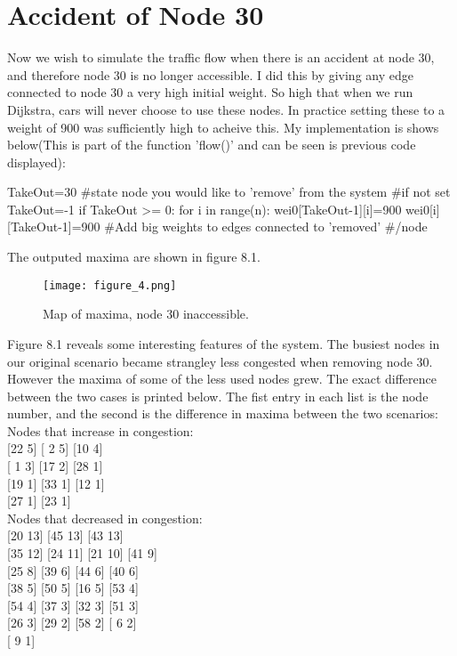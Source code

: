 \documentclass[paper=a4, fontsize=12pt]{scrartcl} %
\numberwithin{equation}{section}       %
\numberwithin{figure}{section}         %
\numberwithin{table}{section}          %
\begin{document}
\section{Accident of Node 30}
Now we wish to simulate the traffic flow when there is an accident at node 30, and therefore node 30 is no longer accessible. I did this by giving any edge connected to node 30 a very high initial weight. So high that when we run Dijkstra, cars will never choose to use these nodes. In practice setting these to a weight of 900 was sufficiently high to acheive this. My implementation is shows below(This is part of the function 'flow()' and can be seen is previous code displayed):
\begin{python}
	TakeOut=30 
	#state node you would like to 'remove' from the system
	#if not set TakeOut=-1
	if TakeOut >= 0:    
		for i in range(n):
		wei0[TakeOut-1][i]=900
		wei0[i][TakeOut-1]=900
	    #Add big weights to edges connected to 'removed' 
	    #/node
\end{python}
The outputed maxima are shown in figure 8.1.
\begin{figure}[H]
	\centering
	\texttt{[image: figure\_4.png]}
	\caption{Map of maxima, node 30 inaccessible.}
	\label{fig:myfigure4}
\end{figure}
Figure 8.1 reveals some interesting features of the system. The busiest nodes in our original scenario became strangley less congested when removing node 30. However the maxima of some of the less used nodes grew.	The exact difference between the two cases is printed below. The fist entry in each list is the node number, and the second is the difference in maxima between the two scenarios:
\\Nodes that increase in congestion:
{\\}[22  5]
[ 2  5]
[10  4]
{\\}[ 1  3]
[17  2]
[28  1]
{\\}[19  1]
[33  1]
[12  1]
{\\}[27  1]
[23  1]
\\Nodes that decreased in congestion:
{\\}
[20 13]
[45 13]
[43 13]
{\\}[35 12]
[24 11]
[21 10]
[41  9]
{\\}[25  8]
[39  6]
[44  6]
[40  6]
{\\}[38  5]
[50  5]
[16  5]
[53  4]
{\\}[54  4]
[37  3]
[32  3]
[51  3]
{\\}[26  3]
[29  2]
[58  2]
[ 6  2]
{\\}[ 9  1]
\end{document}
